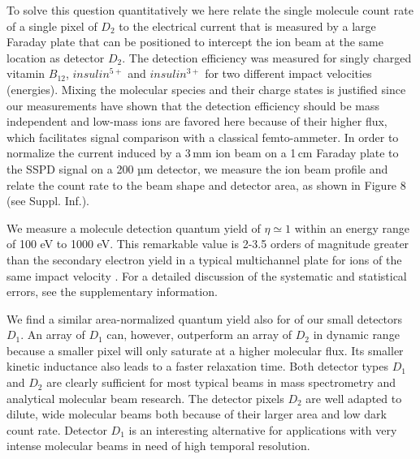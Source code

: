 \documentclass[12pt]{article}
\begin{document}
To solve this question quantitatively we here relate the single molecule count rate of a single pixel of $D_2$ to the electrical current that is measured by a large Faraday plate that can be positioned to intercept the ion beam at the same location as detector $D_2$. The detection efficiency was measured for singly charged vitamin $B_{12}$, $insulin^{5+}$ and $insulin^{3+}$ for two different impact velocities (energies). Mixing the molecular species and their charge states is justified since our measurements have shown that the detection efficiency should be mass independent and low-mass ions are favored here because of their higher flux, which facilitates signal comparison with a classical femto-ammeter. 
In order to normalize the current induced by a 3\,mm ion beam on a 1\,cm Faraday plate to the SSPD signal on a 200 µm detector, we measure the ion beam profile and relate the count rate to the beam shape and detector area, as shown in Figure 8 (see Suppl. Inf.). 

We measure a molecule detection quantum yield of $\eta \simeq 1$ within an energy range of 100 eV to 1000 eV. This remarkable value is 2-3.5 orders of magnitude greater than the secondary electron yield in a typical multichannel plate for ions of the same impact velocity \cite{Liu2014}. For a detailed discussion of the systematic and statistical errors, see the supplementary information. 

We find a similar area-normalized quantum yield also for of our small detectors $D_1$. An array of $D_1$ can, however, outperform an array of $D_2$ in dynamic range because a smaller pixel will only saturate at a higher molecular flux. Its smaller kinetic inductance also leads to a faster relaxation time. 
Both detector types $D_1$ and $D_2$ are clearly sufficient for most typical beams in mass spectrometry and analytical molecular beam research. The detector pixels $D_2$ are well adapted to dilute, wide molecular beams both because of their larger area and low dark count rate. Detector $D_1$ is an interesting alternative for applications with very intense molecular beams in need of high temporal resolution. 
\end{document}
